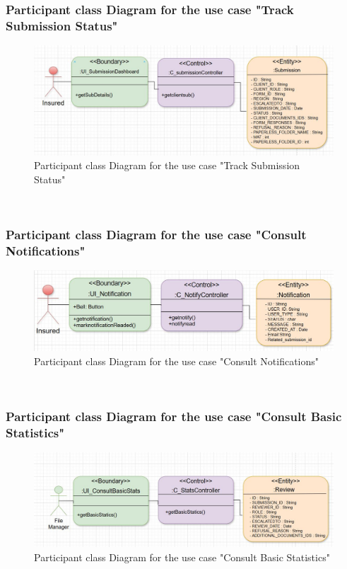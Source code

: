 \subsubsection{Participant class Diagram for the use case "Track Submission Status"}
\begin{figure}[h!]
    \centering
    \includegraphics[width=1\textwidth]{figures/dc track sub status.JPG}
    \caption{Participant class Diagram for the use case "Track Submission Status"}
\end{figure}\

\subsubsection{Participant class Diagram for the use case "Consult Notifications"}
\begin{figure}[h!]
    \centering
    \includegraphics[width=1\textwidth]{figures/dc consult notifications.JPG}
    \caption{Participant class Diagram for the use case "Consult Notifications"}
\end{figure}\
\clearpage
\subsubsection{Participant class Diagram for the use case "Consult Basic Statistics"}
\begin{figure}[h!]
    \centering
    \includegraphics[width=1\textwidth]{figures/dc consult basic statistics.JPG}
    \caption{Participant class Diagram for the use case "Consult Basic Statistics"}
\end{figure}\
